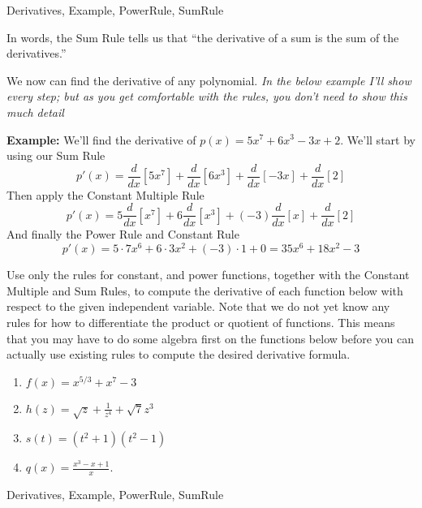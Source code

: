\begin{tagblock}{Derivatives, Example, PowerRule, SumRule}
\begin{question}
In words, the Sum Rule tells us that ``the derivative of a sum is the sum of the derivatives.''

We now can find the derivative of any polynomial.  \emph{In the below example I'll show every step; but as you get comfortable with the rules, you don't need to show this much detail}

\textbf{Example:} We'll find the derivative of $p(x) = 5x^7 + 6x^3 -3x +2$.  We'll start by using our Sum Rule
\[ p'(x) = \frac{d}{dx} [5x^7] +  \frac{d}{dx} [6x^3] +  \frac{d}{dx} [-3x] + \frac{d}{dx} [2] \]
Then apply the Constant Multiple Rule
\[p'(x) =5 \frac{d}{dx} [x^7] + 6 \frac{d}{dx} [x^3] + (-3) \frac{d}{dx} [x] + \frac{d}{dx} [2]\]
And finally the Power Rule and Constant Rule
\[p'(x) =5 \cdot 7x^6+ 6 \cdot 3x^2 + (-3)\cdot 1+ 0 = 35x^6 + 18x^2 -3 \]



\item Use only the rules for constant, and power functions, together with the Constant Multiple and Sum Rules, to compute the derivative of each function below with respect to the given independent variable. Note that we do not yet know any rules for how to differentiate the product or quotient of functions. This means that you may have to do some algebra first on the functions below before you can actually use existing rules to compute the desired derivative formula.
\begin{enumerate}
\item $f(x) = x^{5/3} + x^7 - 3$
\vspace{.7in}

\item $\displaystyle h(z) = \sqrt{z} + \frac{1}{z^4} + \sqrt{7}z^3$
\vspace{.7in}

\item $s(t) = (t^2+1)(t^2-1) $
\vspace{.7in}

\item $\displaystyle q(x) = \frac{x^3-x+1}{x}$.
\end{enumerate} 






	
	
\begin{tags}
	    Derivatives, Example, PowerRule, SumRule
\end{tags}
	
\begin{diary}
\end{diary}
	
\begin{solution}
	   
\end{solution}
	
\end{question}

\end{tagblock}

